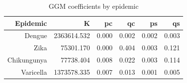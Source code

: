 \begin{table}[ht]
\centering
\begin{tabular}{rrrrrr}
  \toprule
Epidemic & K   & pc   & qc   & ps   & qs   \\ 
  \midrule
Dengue & 2363614.532 & 0.000 & 0.002 & 0.002 & 0.003 \\ 
  Zika & 75301.170 & 0.000 & 0.404 & 0.003 & 0.121 \\ 
  Chikungunya & 77738.404 & 0.008 & 0.022 & 0.003 & 0.114 \\ 
  Varicella & 1373578.335 & 0.007 & 0.013 & 0.001 & 0.005 \\ 
   \bottomrule
\end{tabular}
\caption{GGM coefficients by epidemic} 
\label{tab:ggm_coefs_epidemics}
\end{table}
